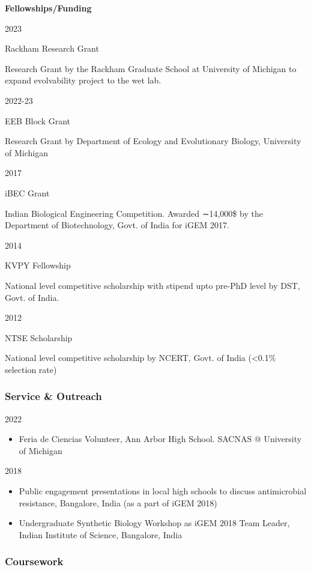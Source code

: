 \documentclass[
  letterpaper,
  DIV=11,
  numbers=noendperiod]{scrartcl}
\providecommand{\tightlist}{%
  \setlength{\itemsep}{0pt}\setlength{\parskip}{0pt}}\usepackage{longtable,booktabs,array}
\begin{document}
\textbf{Fellowships/Funding}

2023

Rackham Research Grant

Research Grant by the Rackham Graduate School at University of Michigan
to expand evolvability project to the wet lab.

2022-23

EEB Block Grant

Research Grant by Department of Ecology and Evolutionary Biology,
University of Michigan

2017

iBEC Grant

Indian Biological Engineering Competition. Awarded ∼14,000\$ by the
Department of Biotechnology, Govt. of India for iGEM 2017.

2014

KVPY Fellowship

National level competitive scholarship with stipend upto pre-PhD level
by DST, Govt. of India.

2012

NTSE Scholarship

National level competitive scholarship by NCERT, Govt. of India
(\textless0.1\% selection rate)

\subsubsection{Service \& Outreach}\label{service-outreach}

2022

\begin{itemize}
\tightlist
\item
  Feria de Ciencias Volunteer, Ann Arbor High School. SACNAS @
  University of Michigan
\end{itemize}

2018

\begin{itemize}
\tightlist
\item
  Public engagement presentations in local high schools to discuss
  antimicrobial resistance, Bangalore, India (as a part of iGEM 2018)
\item
  Undergraduate Synthetic Biology Workshop as iGEM 2018 Team Leader,
  Indian Institute of Science, Bangalore, India
\end{itemize}

\subsubsection{Coursework}\label{coursework}
\end{document}
